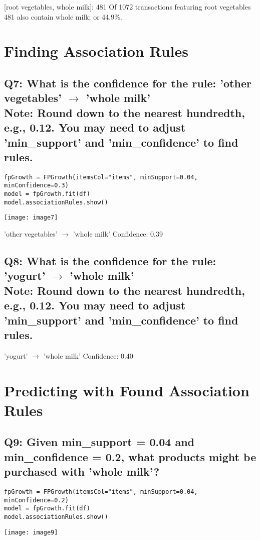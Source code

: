\documentclass[]{article}
\begin{document}
[root vegetables, whole milk]: 481 
Of 1072 transactions featuring root vegetables 481 also contain whole milk;
or 44.9\%.

\section*{Finding Association Rules}

\subsection*{Q7: What is the confidence for the rule: 'other vegetables' $\rightarrow$ 'whole milk' \\ Note: Round down to the nearest hundredth, e.g., 0.12. You may need to adjust 'min\_support' and 'min\_confidence' to find rules.}

\begin{verbatim}
fpGrowth = FPGrowth(itemsCol="items", minSupport=0.04, minConfidence=0.3)
model = fpGrowth.fit(df)
model.associationRules.show()
\end{verbatim}
\texttt{[image: image7]}

'other vegetables' $\rightarrow$ 'whole milk' Confidence: 0.39

\subsection*{Q8: What is the confidence for the rule: 'yogurt' $\rightarrow$ 'whole milk' \\	Note: Round down to the nearest hundredth, e.g., 0.12. You may need to adjust 'min\_support' and 'min\_confidence' to find rules.}

'yogurt' $\rightarrow$ 'whole milk' Confidence: 0.40

\section*{Predicting with Found Association Rules}

\subsection*{Q9: Given min\_support = 0.04 and min\_confidence = 0.2, what products might be purchased	with 'whole milk'?}

\begin{verbatim}
fpGrowth = FPGrowth(itemsCol="items", minSupport=0.04, minConfidence=0.2)
model = fpGrowth.fit(df)
model.associationRules.show()
\end{verbatim}
\texttt{[image: image9]}
\end{document}
